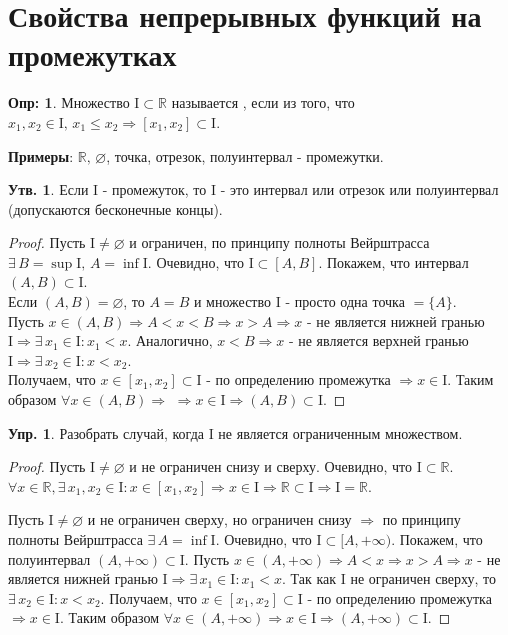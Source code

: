 \documentclass[12pt]{article}
\newcommand{\MR}{\mathbb{R}}
\newcommand{\MI}{\mathrm{I}}
\newcommand{\VN}{\varnothing}
\theoremstyle{definition}
\newtheorem{defn}{Опр:}
\newtheorem{prop}{Утв.}
\newtheorem{exrc}{Упр.}
\begin{document}

\section*{Свойства непрерывных функций на промежутках}

\begin{defn}
	Множество $\MI \subset \MR$ называется , если из того, что $x_1, x_2 \in \MI, \, x_1 \leq x_2 \Rightarrow [x_1,x_2] \subset \MI$.
\end{defn}

\textbf{Примеры}: $\MR, \, \VN$, точка, отрезок, полуинтервал - промежутки.

\begin{prop}
	Если $\MI$ - промежуток, то $\MI$ - это интервал или отрезок или полуинтервал (допускаются бесконечные концы).
\end{prop}

\begin{proof}
	Пусть $\MI \neq \VN$ и ограничен, по принципу полноты Вейрштрасса $\exists \, B = \sup{\MI}, \, A = \inf{\MI}$. Очевидно, что $\MI \subset [A,B]$. Покажем, что интервал $(A,B) \subset \MI$. \\
	Если $(A,B) = \VN$, то $A = B$ и множество $\MI$ - просто одна точка $= \{A\}$.\\
	Пусть $x \in (A,B) \Rightarrow A < x < B \Rightarrow x > A \Rightarrow x$ - не является нижней гранью $\MI \Rightarrow \exists \, x_1 \in \MI \colon x_1 < x$. Аналогично, $x < B \Rightarrow x$ - не является верхней гранью  $\MI \Rightarrow \exists \, x_2 \in \MI \colon x < x_2$. \\
	Получаем, что $x \in [x_1,x_2] \subset \MI$ - по определению промежутка $\Rightarrow x \in \MI$. Таким образом $\forall x \in (A,B) \Rightarrow$ $\Rightarrow x \in \MI \Rightarrow (A,B) \subset \MI$.
\end{proof}

\begin{exrc}
	Разобрать случай, когда $\MI$ не является ограниченным множеством.
\end{exrc}
\begin{proof}
	Пусть $\MI \neq \VN$ и не ограничен снизу и сверху. Очевидно, что $\MI \subset \MR$. 
	$\forall x \in \MR, \exists \, x_1, x_2 \in \MI \colon x \in [x_1,x_2] \Rightarrow x \in \MI \Rightarrow \MR \subset \MI \Rightarrow \MI = \MR$.
	
	Пусть $\MI \neq \VN$ и не ограничен сверху, но ограничен снизу $\Rightarrow$ по принципу полноты Вейрштрасса $\exists \, A = \inf{\MI}$. Очевидно, что $\MI \subset [A,+\infty)$. Покажем, что полуинтервал $(A,+\infty) \subset \MI$. Пусть $x \in (A,+\infty) \Rightarrow A < x  \Rightarrow x > A \Rightarrow x$ - не является нижней гранью $\MI \Rightarrow \exists \, x_1 \in \MI \colon x_1 < x$. Так как $\MI$ не ограничен сверху, то $\exists \, x_2 \in \MI \colon x < x_2$. Получаем, что $x \in [x_1,x_2] \subset \MI$ - по определению промежутка $\Rightarrow x \in \MI$. Таким образом $\forall x \in (A,+\infty) \Rightarrow x \in \MI \Rightarrow (A,+\infty) \subset \MI$.
\end{proof}
\end{document}
